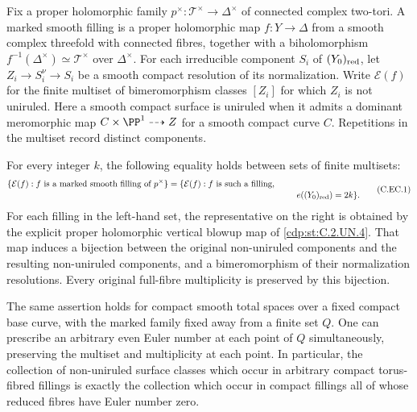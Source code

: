 \begin{proposition}\label{cdp:st:C.2.UN.14}

Fix a proper holomorphic family $p^\times:\mathcal T^\times\to\Delta^\times$
of connected complex two-tori. A marked smooth filling is a proper
holomorphic map $f:Y\to\Delta$ from a smooth complex threefold with
connected fibres, together with a biholomorphism
$f^{-1}(\Delta^\times)\simeq\mathcal T^\times$ over $\Delta^\times$.
For each irreducible component $S_i$ of $(Y_0)_{\rm red}$, let
$Z_i\to S_i^\nu\to S_i$ be a smooth compact resolution of its
normalization. Write $\mathcal E(f)$ for the finite multiset of
bimeromorphism classes $[Z_i]$ for which $Z_i$ is not uniruled.
Here a smooth compact surface is uniruled when it admits a dominant
meromorphic map $C\times\PP^1\dashrightarrow Z$ for a smooth compact
curve $C$. Repetitions in the multiset record distinct components.

For every integer $k$, the following equality holds between sets of
finite multisets:
\[
 \begin{split}
 \{\mathcal E(f): f\text{ is a marked smooth filling of }p^\times\}
 ={}&\{\mathcal E(f): f\text{ is such a filling},\\[-2pt]
 &\hspace{48mm}e((Y_0)_{\rm red})=2k\}.
 \end{split}                                                     \tag{C.EC.1}\label{cdp:eq:C.EC.1}
\]
For each filling in the left-hand set, the representative on the
right is obtained by the explicit proper holomorphic vertical
blowup map of \ref{cdp:st:C.2.UN.4}. That map induces a bijection between the
original non-uniruled components and the resulting non-uniruled
components, and a bimeromorphism of their normalization resolutions.
Every original full-fibre multiplicity is preserved by this bijection.

The same assertion holds for compact smooth total spaces over a
fixed compact base curve, with the marked family fixed away from a
finite set $Q$. One can prescribe an arbitrary even Euler number at
each point of $Q$ simultaneously, preserving the multiset and
multiplicity at each point. In particular, the collection of
non-uniruled surface classes which occur in arbitrary compact
torus-fibred fillings is exactly the collection which occur in
compact fillings all of whose reduced fibres have Euler number zero.
\end{proposition}

